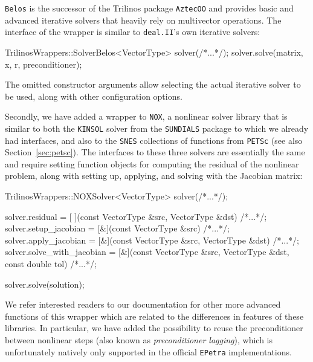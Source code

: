 \documentclass{ansarticle-preprint}
\newcommand{\specialword}[1]{\texttt{#1}}
\newcommand{\dealii}{{\specialword{deal.II}}\xspace}
\begin{document}
\texttt{Belos} is the
successor of the Trilinos package \texttt{AztecOO} and provides basic and advanced iterative solvers
that heavily rely on multivector operations. The interface of the
wrapper is similar to \dealii{}'s own iterative solvers:
\begin{c++}
TrilinosWrappers::SolverBelos<VectorType> solver(/*...*/);
solver.solve(matrix, x, r, preconditioner);
\end{c++}
The omitted constructor arguments allow selecting the actual iterative
solver to be used, along with other configuration options.

Secondly, we have added a wrapper to \texttt{NOX}, a
nonlinear solver library that is similar to both the \texttt{KINSOL} solver from
the \texttt{SUNDIALS} package to which we already had interfaces, and also
to the \texttt{SNES} collections of functions from \texttt{PETSc} (see also
Section~\ref{sec:petsc}). The interfaces to these three solvers are
essentially the same and require setting function objects for
computing the residual of the nonlinear problem, along with setting
up, applying, and solving with the Jacobian matrix:
\begin{c++}
TrilinosWrappers::NOXSolver<VectorType> solver(/*...*/);

solver.residual            = [ ](const VectorType &src,
                                 VectorType       &dst) {/*...*/};
solver.setup_jacobian      = [&](const VectorType &src) {/*...*/};
solver.apply_jacobian      = [&](const VectorType &src,
                                 VectorType       &dst) {/*...*/};
solver.solve_with_jacobian = [&](const VectorType &src,
                                 VectorType       &dst,
                                 const double      tol) {/*...*/};

solver.solve(solution);
\end{c++}

We refer interested readers to our documentation for other more advanced
functions of this wrapper which are related to the differences in features of these libraries.
In particular, we have added the possibility to reuse the preconditioner between
nonlinear steps (also known as \textit{preconditioner lagging}), which is
unfortunately natively only  supported in the official \texttt{EPetra} implementations.

\end{document}
